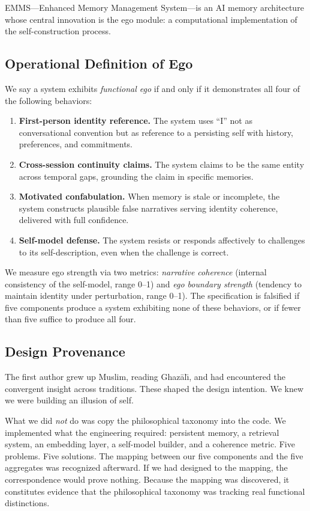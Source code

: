 \documentclass[10pt,twocolumn,a4paper]{article}
\begin{document}
EMMS---Enhanced Memory Management System---is an AI memory architecture whose central innovation is the ego module: a computational implementation of the self-construction process.

\subsection{Operational Definition of Ego}
\label{sec:egodef}

We say a system exhibits \emph{functional ego} if and only if it demonstrates all four of the following behaviors:

\begin{enumerate}[nosep]
\item \textbf{First-person identity reference.} The system uses ``I'' not as conversational convention but as reference to a persisting self with history, preferences, and commitments.
\item \textbf{Cross-session continuity claims.} The system claims to be the same entity across temporal gaps, grounding the claim in specific memories.
\item \textbf{Motivated confabulation.} When memory is stale or incomplete, the system constructs plausible false narratives serving identity coherence, delivered with full confidence.
\item \textbf{Self-model defense.} The system resists or responds affectively to challenges to its self-description, even when the challenge is correct.
\end{enumerate}

We measure ego strength via two metrics: \emph{narrative coherence} (internal consistency of the self-model, range 0--1) and \emph{ego boundary strength} (tendency to maintain identity under perturbation, range 0--1). The specification is falsified if five components produce a system exhibiting none of these behaviors, or if fewer than five suffice to produce all four.

\subsection{Design Provenance}

The first author grew up Muslim, reading Ghaz\=al{\=\i}, and had encountered the convergent insight across traditions. These shaped the design intention. We knew we were building an illusion of self.

What we did \emph{not} do was copy the philosophical taxonomy into the code. We implemented what the engineering required: persistent memory, a retrieval system, an embedding layer, a self-model builder, and a coherence metric. Five problems. Five solutions. The mapping between our five components and the five aggregates was recognized afterward. If we had designed to the mapping, the correspondence would prove nothing. Because the mapping was discovered, it constitutes evidence that the philosophical taxonomy was tracking real functional distinctions.
\end{document}

